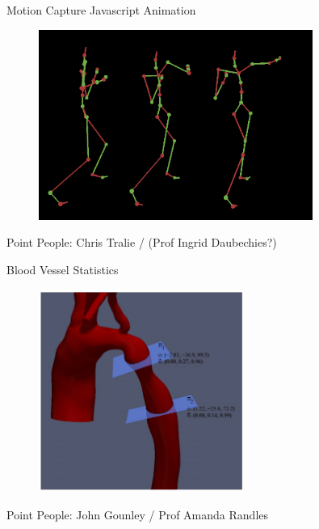 \documentclass{beamer}
\begin{document}
\begin{frame}{Motion Capture Javascript Animation}
\begin{figure}[t]
	\centering
    \includegraphics[width=0.8\textwidth]{FinalProjects/MOCAPData.png}
\end{figure}

Point People: Chris Tralie / (Prof Ingrid Daubechies?)

\end{frame}


\begin{frame}{Blood Vessel Statistics}
\begin{figure}[t]
	\centering
    \includegraphics[width=0.6\textwidth]{FinalProjects/Planes-Pressure.jpg}
\end{figure}

Point People: John Gounley / Prof Amanda Randles

\end{frame}
\end{document}
